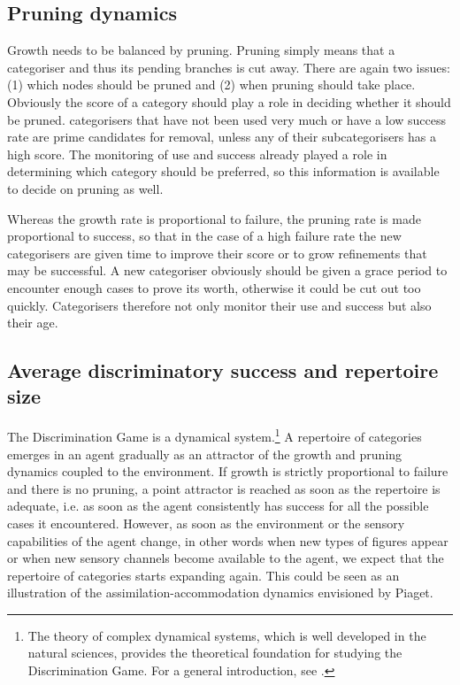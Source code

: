 \subsection{Pruning dynamics}

Growth needs to be balanced by pruning. Pruning simply means
that a categoriser and thus its pending branches is 
cut away. There are again two
issues: (1) which nodes should be pruned and
(2) when pruning should take place. 
Obviously the score of a category should play a role
in deciding whether it should be pruned. 
categorisers that have not been used very much or have a low
success rate are prime candidates for removal, unless
any of their subcategorisers has a high score. The 
monitoring of use and success already played a role in 
determining which category should be preferred, so this
information is available to decide on pruning as well. 

Whereas the growth rate is proportional to failure, the pruning
rate is made proportional to success, so that 
in the case of a high failure rate the new categorisers are given
time to improve their score or to grow refinements that may be 
successful. A new categoriser obviously should be given
a grace period to encounter enough cases to prove
its worth, otherwise it could be cut out too quickly. Categorisers 
therefore not only monitor their use and success but 
also their age. 

\subsection{Average discriminatory success and repertoire size}

The Discrimination Game is a dynamical system.\footnote{
The theory of complex dynamical systems, which is well 
developed in the natural sciences, provides the 
theoretical foundation for studying the Discrimination
Game. For a general introduction, see \cite{Peitgen:1992}.} A repertoire of
categories emerges in an agent gradually as an attractor of the
growth and pruning dynamics coupled to 
the environment. If growth is strictly proportional to failure
and there is no pruning, a point attractor
is reached as soon as the repertoire
is adequate, i.e. as soon 
as the agent consistently has success
for all the possible cases it encountered. However, 
as soon as the environment or the sensory capabilities of 
the agent change, in other words when new types of 
figures appear or when new sensory channels become available
to the agent, we expect that the repertoire of categories starts
expanding again. This could be seen as an illustration  of the
assimilation-accommodation dynamics envisioned by Piaget. 

